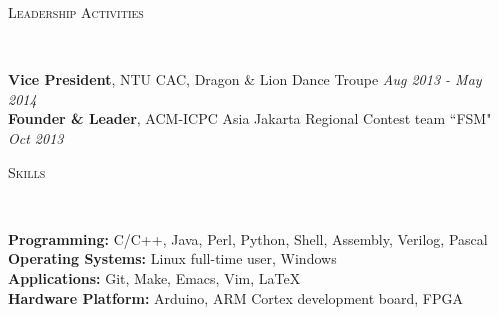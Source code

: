 \documentclass[a4paper, 12pt]{article}
\newenvironment{changemargin}[2]{%
  \begin{list}{}{%
      \setlength{\topsep}{0pt}%
      \setlength{\leftmargin}{#1}%
      \setlength{\rightmargin}{#2}%
      \setlength{\listparindent}{\parindent}%
      \setlength{\itemindent}{\parindent}%
      \setlength{\parsep}{\parskip}%
    }%
  \item[]}{\end{list}
}
\newcommand{\lineover}{
  \begin{changemargin}{-0.05in}{-0.05in}
    \vspace*{-8pt}
    \hrulefill \\
    \vspace*{-2pt}
  \end{changemargin}
}
\newcommand{\header}[1]{
  \begin{changemargin}{-0.5in}{-0.5in}
    \scshape{#1}\\
    \lineover
  \end{changemargin}
}
\newenvironment{body}
{
\vspace*{-16pt}
\begin{changemargin}{-0.25in}{-0.5in}
}	
{
\end{changemargin}
}
\begin{document}

\smallskip
\medskip
\header{Leadership Activities}
\begin{body}
  \vspace{14pt}
  \textbf{Vice President}, NTU CAC, Dragon \& Lion Dance Troupe \hfill {} \emph{Aug 2013 - May 2014}\\
  \smallskip
  \textbf{Founder \& Leader}, ACM-ICPC Asia Jakarta Regional Contest team ``FSM" \hfill {} \emph{Oct 2013}\\
\end{body}

%
%

\smallskip
\medskip
\header{Skills}
\begin{body}
  \vspace{14pt}
  \textbf{Programming:}{} C/C++, Java, Perl, Python, Shell, Assembly, Verilog, Pascal\\
  \medskip
  \textbf{Operating Systems:}{} Linux full-time user, Windows\\
  \medskip
  \textbf{Applications:}{} Git, Make, Emacs, Vim, \LaTeX\\
  \medskip
  \textbf{Hardware Platform:}{} Arduino, ARM Cortex development board, FPGA\\
\end{body}
\end{document}
